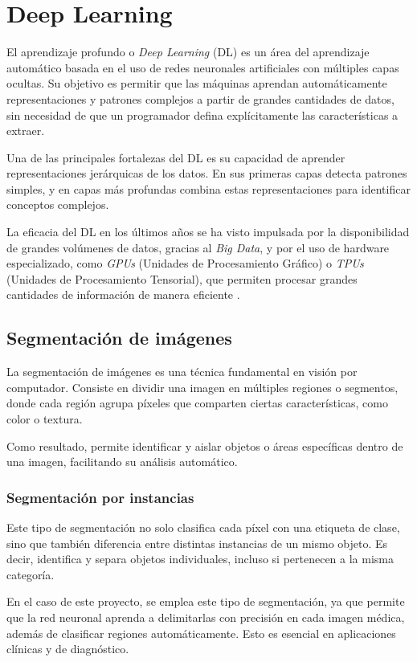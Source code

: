 \section{Deep Learning}
El aprendizaje profundo o \textit{Deep Learning} (DL) es un área del aprendizaje automático basada en el uso de redes neuronales artificiales con múltiples capas ocultas. Su objetivo es permitir que las máquinas aprendan automáticamente representaciones y patrones complejos a partir de grandes cantidades de datos, sin necesidad de que un programador defina explícitamente las características a extraer.

Una de las principales fortalezas del DL es su capacidad de aprender representaciones jerárquicas de los datos. En sus primeras capas detecta patrones simples, y en capas más profundas combina estas representaciones para identificar conceptos complejos.

La eficacia del DL en los últimos años se ha visto impulsada por la disponibilidad de grandes volúmenes de datos, gracias al \textit{Big Data}, y por el uso de hardware especializado, como \textit{GPUs} (Unidades de Procesamiento Gráfico) o \textit{TPUs} (Unidades de Procesamiento Tensorial), que permiten procesar grandes cantidades de información de manera eficiente \cite{deeplearning2016}. 

\subsection{Segmentación de imágenes}
La segmentación de imágenes es una técnica fundamental en visión por computador. Consiste en dividir una imagen en múltiples regiones o segmentos, donde cada región agrupa píxeles que comparten ciertas características, como color o textura.

Como resultado, permite identificar y aislar objetos o áreas específicas dentro de una imagen, facilitando su análisis automático. 

\subsubsection{Segmentación por instancias}
Este tipo de segmentación no solo clasifica cada píxel con una etiqueta de clase, sino que también diferencia entre distintas instancias de un mismo objeto. Es decir, identifica y separa objetos individuales, incluso si pertenecen a la misma categoría. \cite{klinger2023segmentacion}

En el caso de este proyecto, se emplea este tipo de segmentación, ya que permite que la red neuronal aprenda a delimitarlas con precisión en cada imagen médica, además de clasificar regiones automáticamente. Esto es esencial en aplicaciones clínicas y de diagnóstico.

